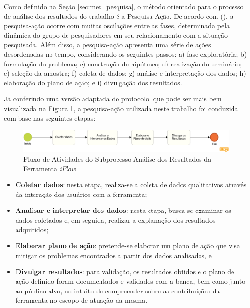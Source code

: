 \label{sec:meto_analise_resultado}

Como definido na Seção \ref{sec:met_pesquisa}, o método orientado para o processo de análise dos resultados do trabalho é a Pesquisa-Ação. De acordo com  (\citeyear{gil2002elaborar}), a pesquisa-ação ocorre com muitas oscilações entre as fases, determinada pela dinâmica do grupo de pesquisadores em seu relacionamento com a situação pesquisada. Além disso, a pesquisa-ação apresenta uma série de ações desordenadas no tempo, considerando os seguintes passos: a) fase exploratória; b) formulação do problema; c) construção de hipóteses; d) realização do seminário; e) seleção da amostra; f) coleta de dados; g) análise e interpretação dos dados; h) elaboração do plano de ação; e i) divulgação dos resultados.

Já conferindo uma versão adaptada do protocolo, que pode ser mais bem visualizada na Figura \ref{fig:bpmn_analise}, a pesquisa-ação utilizada neste trabalho foi conduzida com base nas seguintes etapas:

\begin{figure}[H]
    \begin{center}
        \caption{Fluxo de Atividades do Subprocesso Análise dos Resultados da Ferramenta \textit{iFlow}}
        \label{fig:bpmn_analise}
        \includegraphics[scale=0.28]{figuras/Metodologia/bpmn_analise.png}
    \end{center}
\end{figure}

\begin{itemize}
    \item \textbf{Coletar dados}: nesta etapa, realiza-se a coleta de dados qualitativos através da interação dos usuários com a ferramenta;
    \item \textbf{Analisar e interpretar dos dados}: nesta etapa, busca-se examinar os dados coletados e, em seguida, realizar a explanação dos resultados adquiridos;
    \item \textbf{Elaborar plano de ação}: pretende-se elaborar um plano de ação que visa mitigar os problemas encontrados a partir dos dados analisados, e 
    \item \textbf{Divulgar resultados}: para validação, os resultados obtidos e o plano de ação definido foram documentados e validados com a banca, bem como junto ao público alvo, no intuito de compreender sobre as contribuições da ferramenta no escopo de atuação da mesma.
\end{itemize}

